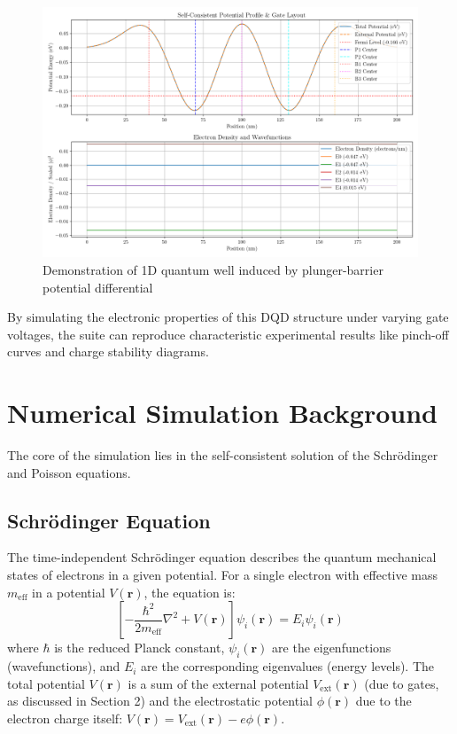 \documentclass{article}
\begin{document}
\begin{figure}[h!]
	\centering
	\includegraphics[width=\textwidth]{../figures/simulation_results.png}
	\caption{Demonstration of 1D quantum well induced by plunger-barrier potential differential}
	\label{fig:sim1d}
\end{figure}

By simulating the electronic properties of this DQD structure under varying gate voltages, the suite can reproduce characteristic experimental results like pinch-off curves and charge stability diagrams.

\section{Numerical Simulation Background}
The core of the simulation lies in the self-consistent solution of the Schrödinger and Poisson equations.

\subsection{Schrödinger Equation}
The time-independent Schrödinger equation describes the quantum mechanical states of electrons in a given potential. For a single electron with effective mass $m_{\text{eff}}$ in a potential $V(\mathbf{r})$, the equation is:
\begin{equation}
	\left[ -\frac{\hbar^2}{2m_{\text{eff}}} \nabla^2 + V(\mathbf{r}) \right] \psi_i(\mathbf{r}) = E_i \psi_i(\mathbf{r})
\end{equation}
where $\hbar$ is the reduced Planck constant, $\psi_i(\mathbf{r})$ are the eigenfunctions (wavefunctions), and $E_i$ are the corresponding eigenvalues (energy levels). The total potential $V(\mathbf{r})$ is a sum of the external potential $V_{\text{ext}}(\mathbf{r})$ (due to gates, as discussed in Section 2) and the electrostatic potential $\phi(\mathbf{r})$ due to the electron charge itself: $V(\mathbf{r}) = V_{\text{ext}}(\mathbf{r}) - e \phi(\mathbf{r})$.
\end{document}
